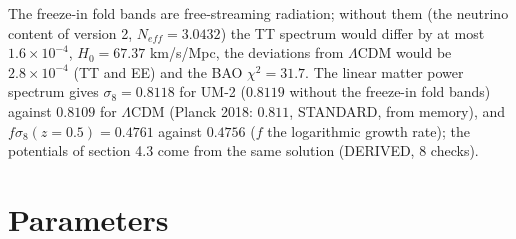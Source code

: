 \documentclass[
  10pt,
]{article}
\begin{document}
The freeze-in fold bands are free-streaming radiation; without them (the
neutrino content of version 2, \(N_{eff} = 3.0432\)) the TT spectrum
would differ by at most \(1.6\times10^{-4}\), \(H_0 = 67.37\) km/s/Mpc,
the deviations from \(\Lambda\)CDM would be \(2.8\times10^{-4}\) (TT and
EE) and the BAO \(\chi^2 = 31.7\). The linear matter power spectrum
gives \(\sigma_8 = 0.8118\) for UM-2 (\(0.8119\) without the freeze-in
fold bands) against \(0.8109\) for \(\Lambda\)CDM (Planck 2018:
\(0.811\), STANDARD, from memory), and \(f\sigma_8(z = 0.5) = 0.4761\)
against \(0.4756\) (\(f\) the logarithmic growth rate); the potentials
of section 4.3 come from the same solution (DERIVED, 8 checks).

\hypertarget{parameters}{%
\section{Parameters}\label{parameters}}
\end{document}
